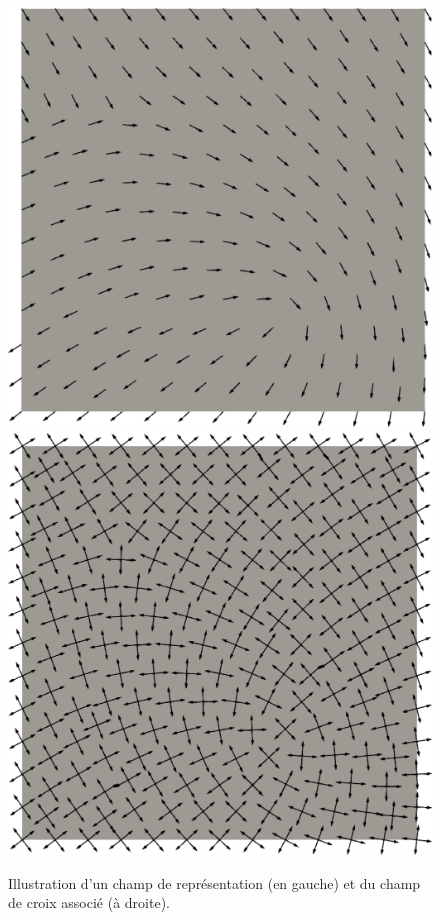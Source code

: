 \begin{figure}[h!]
  \centering
  \includegraphics[scale=0.26]{images/repre_field.pdf}
  \hfill
  \includegraphics[scale=0.26]{images/cross_from_repre_field.pdf}
  \caption{Illustration d'un champ de représentation (en gauche) et du champ de croix associé (à droite).}
  \label{fig:repr_to_cross}
\end{figure}

